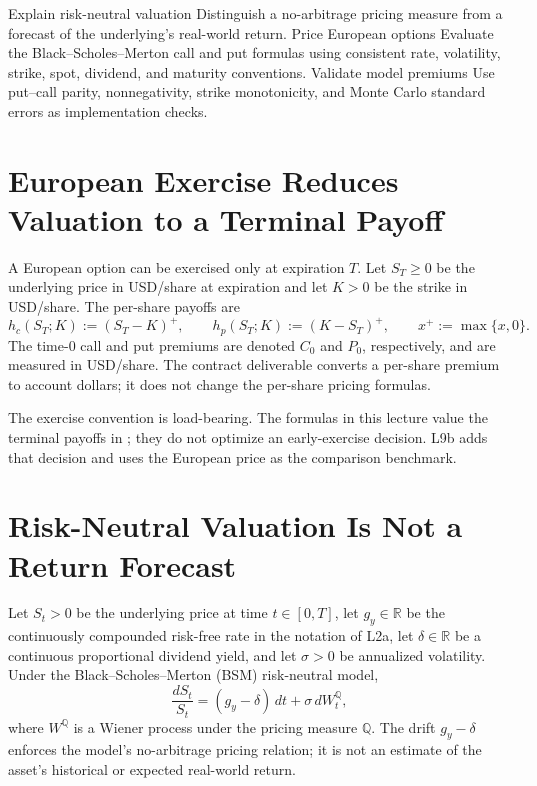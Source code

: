 \documentclass[11pt]{article}
\newcommand{\R}{\mathbb{R}}
\begin{document}

\learningobjectives
  {Explain risk-neutral valuation}
  {Distinguish a no-arbitrage pricing measure from a forecast of the underlying's real-world return.}
  {Price European options}
  {Evaluate the Black--Scholes--Merton call and put formulas using consistent rate, volatility, strike, spot, dividend, and maturity conventions.}
  {Validate model premiums}
  {Use put--call parity, nonnegativity, strike monotonicity, and Monte Carlo standard errors as implementation checks.}

\section{European Exercise Reduces Valuation to a Terminal Payoff}

A European option can be exercised only at expiration $T$. Let $S_T\geq0$ be the underlying price in USD/share at expiration and let $K>0$ be the strike in USD/share. The per-share payoffs are
\begin{equation}
  \label{eq:payoffs}
  h_c(S_T;K):=(S_T-K)^+,
  \qquad
  h_p(S_T;K):=(K-S_T)^+,
  \qquad x^+:=\max\{x,0\}.
\end{equation}
The time-$0$ call and put premiums are denoted $C_0$ and $P_0$, respectively, and are measured in USD/share. The contract deliverable converts a per-share premium to account dollars; it does not change the per-share pricing formulas.

The exercise convention is load-bearing. The formulas in this lecture value the terminal payoffs in ; they do not optimize an early-exercise decision. L9b adds that decision and uses the European price as the comparison benchmark.

\section{Risk-Neutral Valuation Is Not a Return Forecast}

Let $S_t>0$ be the underlying price at time $t\in[0,T]$, let $g_y\in\R$ be the continuously compounded risk-free rate in the notation of L2a, let $\delta\in\R$ be a continuous proportional dividend yield, and let $\sigma>0$ be annualized volatility. Under the Black--Scholes--Merton (BSM) risk-neutral model,
\begin{equation}
  \label{eq:risk-neutral-gbm}
  \frac{dS_t}{S_t}=(g_y-\delta)\,dt+\sigma\,dW_t^{\mathbb Q},
\end{equation}
where $W^{\mathbb Q}$ is a Wiener process under the pricing measure $\mathbb Q$. The drift $g_y-\delta$ enforces the model's no-arbitrage pricing relation; it is not an estimate of the asset's historical or expected real-world return.
\end{document}
